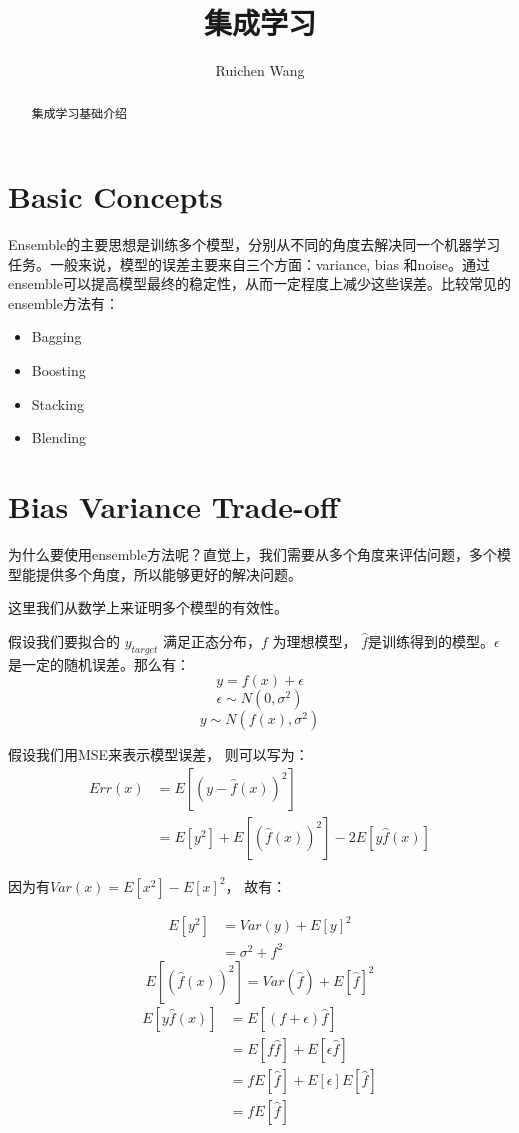 \documentclass[12pt,a4paper,oneside]{article}
\author{Ruichen Wang}
\title{集成学习}
\begin{document}
\begin{CJK*}{UTF8}{gbsn}

\maketitle
\begin{abstract}
集成学习基础介绍
\end{abstract}

\tableofcontents

\section{Basic Concepts}
Ensemble的主要思想是训练多个模型，分别从不同的角度去解决同一个机器学习任务。一般来说，模型的误差主要来自三个方面：variance, bias 和noise。通过ensemble可以提高模型最终的稳定性，从而一定程度上减少这些误差。比较常见的ensemble方法有：
\begin{itemize}
\item Bagging
\item Boosting
\item Stacking
\item Blending
\end{itemize}


\section{Bias Variance Trade-off}

为什么要使用ensemble方法呢？直觉上，我们需要从多个角度来评估问题，多个模型能提供多个角度，所以能够更好的解决问题。

这里我们从数学上来证明多个模型的有效性。

假设我们要拟合的 $y_{target}$ 满足正态分布，$f$ 为理想模型， $\hat{f}$是训练得到的模型。$\epsilon$ 是一定的随机误差。那么有：
$$y=f(x)+\epsilon$$
$$\epsilon \sim N(0,\sigma^{2})$$
$$y \sim N(f(x), \sigma^{2})$$

假设我们用MSE来表示模型误差， 则可以写为：
\begin{align*}
Err(x) &=E \left[ \left(y-\hat{f}(x)\right)^{2} \right] \\ 
 &=E \left[y^{2} \right] + E \left[ \left(\hat{f}(x) \right)^{2} \right]-2E \left[y\hat{f}(x) \right]
\end{align*}

因为有$Var(x)=E\left[x^{2} \right] - E\left[x \right]^{2}$， 故有：

\begin{align*}
E\left[y^{2} \right] &= Var(y) + E\left[y \right]^{2} \\
&= \sigma^{2} +f^{2}
\end{align*}
$$E \left[ \left(\hat{f}(x) \right)^{2} \right] = Var\left( \hat{f}\right) + E\left[\hat{f} \right]^{2}$$
\begin{align*}
E \left[y\hat{f}(x) \right] &= E\left[(f+\epsilon) \hat{f} \right] \\
&= E\left[f \hat{f} \right] + E\left[\epsilon \hat{f} \right] \\ 
&= fE\left[ \hat{f} \right] +E\left[ \epsilon \right]E\left[ \hat{f} \right] \\
&= fE\left[ \hat{f} \right]
\end{align*}


\end{CJK*}
\end{document}
